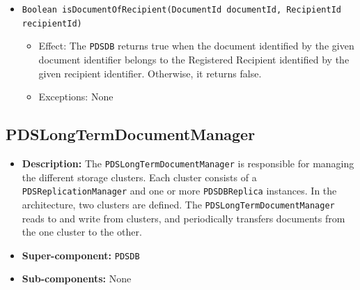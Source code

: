 \documentclass[a4paper,10pt]{article}
\begin{document}
\begin{itemize}
\begin{itemize}
 		\item \texttt{Boolean isDocumentOfRecipient(DocumentId documentId, RecipientId recipientId)}
        \begin{itemize}
            \item Effect: The \texttt{PDSDB} returns true when the document identified by the given document identifier belongs to the Registered Recipient identified by the given recipient identifier. Otherwise, it returns false.
            \item Exceptions: None
		\end{itemize}     
    \end{itemize}
\end{itemize}

\subsection{PDSLongTermDocumentManager}
\begin{itemize}
    \item \textbf{Description:} The \texttt{PDSLongTermDocumentManager} is responsible for managing the different storage clusters. Each cluster consists of a \texttt{PDSReplicationManager} and one or more \texttt{PDSDBReplica} instances. In the architecture, two clusters are defined. The \texttt{PDSLongTermDocumentManager} reads to and write from clusters, and periodically transfers documents from the one cluster to the other.
    \item \textbf{Super-component:} \texttt{PDSDB}
    \item \textbf{Sub-components:} None
\end{itemize}
\end{document}
